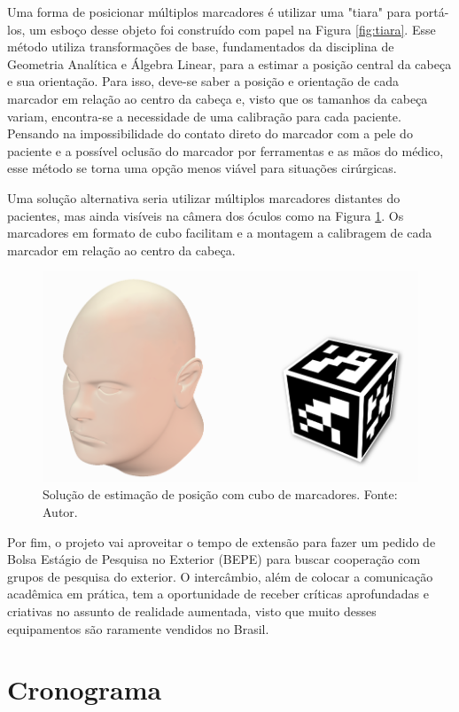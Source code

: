 Uma forma de posicionar múltiplos marcadores é utilizar uma "tiara" para portá-los, um esboço desse objeto foi construído com papel na Figura \ref{fig:tiara}. Esse método utiliza transformações de base, fundamentados da disciplina de Geometria Analítica e Álgebra Linear, para a estimar a posição central da cabeça e sua orientação. Para isso, deve-se saber a posição e orientação de cada marcador em relação ao centro da cabeça e, visto que os tamanhos da cabeça variam, encontra-se a necessidade de uma calibração para cada paciente. Pensando na impossibilidade do contato direto do marcador com a pele do paciente e a possível oclusão do marcador por ferramentas e as mãos do médico, esse método se torna uma opção menos viável para situações cirúrgicas.

Uma solução alternativa seria utilizar múltiplos marcadores distantes do pacientes, mas ainda visíveis na câmera dos óculos como na Figura \ref{fig:cube}. Os marcadores em formato de cubo facilitam e a montagem a calibragem de cada marcador em relação ao centro da cabeça.

\begin{figure}[ht]
    \centering
    \includegraphics[width=.6\linewidth]{figuras/cube.png}
    \caption{Solução de estimação de posição com cubo de marcadores. Fonte: Autor.}
    \label{fig:cube}
\end{figure}

Por fim, o projeto vai aproveitar o tempo de extensão para fazer um pedido de Bolsa Estágio de Pesquisa no Exterior (BEPE) para buscar cooperação com grupos de pesquisa do exterior. O intercâmbio, além de colocar a comunicação acadêmica em prática, tem a oportunidade de receber críticas aprofundadas e criativas no assunto de realidade aumentada, visto que muito desses equipamentos são raramente vendidos no Brasil.

\newpage

\section{Cronograma}

